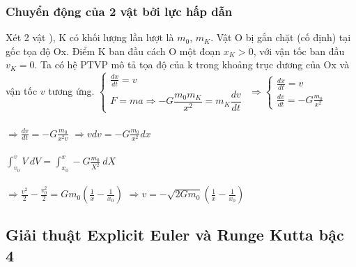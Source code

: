 \documentclass[13pt,a4paper]{article}
\begin{document}
			\subsubsection{Chuyển động của 2 vật bởi lực hấp dẫn}
				Xét 2 vật ), K có khối lượng lần lượt là $m_0$, $m_K$. Vật O bị gắn chặt (cố định) tại gốc tọa độ Ox. Điểm K ban đầu cách O một đoạn $x_K > 0$, với vận tốc ban đầu $v_K = 0$. Ta có hệ PTVP mô tả tọa độ của k trong khoảng trục dương của Ox và vận tốc $v$ tương ứng.
				$\left\{\begin{array}{l}
					\frac{dx}{dt} = v \\
					F = ma \Rightarrow -G\dfrac{m_0m_K}{x^2} = m_K\dfrac{dv}{dt}
				\end{array}\right.$ 
				$\Rightarrow \left\{\begin{array}{l}
					\frac{dx}{dt} = v \\
					\frac{dv}{dt} =  -G\frac{m_0}{x^2}
				\end{array}\right.$ \\ \\
				$\Rightarrow \frac{dv}{dt} =  -G\frac{m_0}{x^2v}$ 
				$\Rightarrow vdv = -G\frac{m_0}{x^2}dx$ \\ \\
				$\displaystyle \int_{v_0}^v V\ dV = \displaystyle \int_{x_0}^x -G\frac{m_0}{X^2}\ dX$ \\ \\
				$\Rightarrow \frac{v^2}{2} - \frac{v_0^2}{2} = Gm_0(\frac{1}{x} - \frac{1}{x_0})$ 
				$\Rightarrow v = -\sqrt{2Gm_0}(\frac{1}{x} - \frac{1}{x_0})$
		\subsection{Giải thuật Explicit Euler và Runge Kutta bậc 4}
\end{document}
